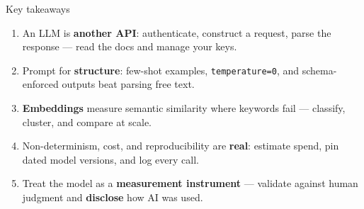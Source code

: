 \documentclass[9pt,aspectratio=169]{beamer}
\begin{document}
\begin{frame}{Key takeaways}
    \begin{enumerate}
        \item An LLM is \textbf{another API}: authenticate, construct a request, parse the response --- read the docs and manage your keys.
        \item Prompt for \textbf{structure}: few-shot examples, \texttt{temperature=0}, and schema-enforced outputs beat parsing free text.
        \item \textbf{Embeddings} measure semantic similarity where keywords fail --- classify, cluster, and compare at scale.
        \item Non-determinism, cost, and reproducibility are \textbf{real}: estimate spend, pin dated model versions, and log every call.
        \item Treat the model as a \textbf{measurement instrument} --- validate against human judgment and \textbf{disclose} how AI was used.
    \end{enumerate}
    \vspace{1em}
\end{frame}
\end{document}
